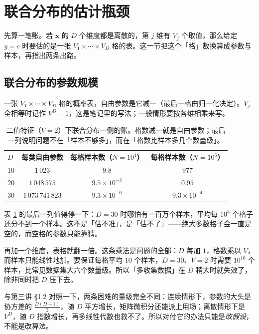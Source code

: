 \documentclass[11pt,a4paper,fontset=windows,zihao=-4]{ctexart}
\newcommand{\bx}{\mathbf{x}}
\newcommand{\tabhead}{\sffamily\bfseries\color{navy}}
\begin{document}

\section{联合分布的估计瓶颈}

先算一笔账。若 $\bx$ 的 $D$ 个维度都是离散的，第 $j$ 维有 $V_j$ 个取值，那么给定 $y=c$ 时要估的是一张 $V_1\times\cdots\times V_D$ 格的表。这一节把这个「格」数换算成参数与样本，再指出两条出路。

\subsection{联合分布的参数规模}

一张 $V_1\times\cdots\times V_D$ 格的概率表，自由参数是它减一（最后一格由归一化决定）。$V_j$ 全相等时记作 $V^D-1$，这是笔记里的写法；一般情形要按各维相乘来写。

\begin{table}[htbp]
\centering
\small
\begin{tabular}{@{}lccc@{}}
\toprule
\rowcolor{navy!7}
\tabhead $D$ & \tabhead 每类自由参数 & \tabhead 每格样本数（$N=10^4$） & \tabhead 每格样本数（$N=10^6$）\\
\midrule
10 & $1\,023$ & $9.8$ & $977$\\
20 & $1\,048\,575$ & $9.5\times10^{-3}$ & $0.95$\\
30 & $1\,073\,741\,823$ & $9.3\times10^{-6}$ & $9.3\times10^{-4}$\\
\bottomrule
\end{tabular}
\caption{二值特征（$V=2$）下联合分布一侧的账。格数减一就是自由参数；最后一列说明问题不在「样本不够多」，而在「格数比样本多几个数量级」。}
\label{tab:joint}
\end{table}

表 \ref{tab:joint} 的最后一列值得停一下：$D=30$ 时哪怕有一百万个样本，平均每 $10^3$ 个格子还分不到一个样本。这不是「估不准」，是「估不了」——绝大多数格子会一直是空的，而空格的参数只能靠猜。

再加一个维度，表格就翻一倍。这条乘法是问题的全部：$D$ 每加 $1$，格数乘以 $V$，而样本只能线性地加。要保证每格平均 $10$ 个样本，$D=30$、$V=2$ 时需要 $10^{10}$ 个样本，比常见数据集大六个数量级。所以「多收集数据」在 $D$ 稍大时就失效了，除非同时把 $D$ 压下去。

与第三讲 §1.2 对照一下，两条困难的量级完全不同：连续情形下，参数的大头是协方差的 $\frac{D(D+1)}2$，随 $D$ 平方增长，矩阵微积分还能派上用场；离散情形下是 $V^D$，随 $D$ 指数增长，再多线性代数也救不了。所以对付它的办法只能是\emph{改假设}，不能是改算法。
\end{document}
